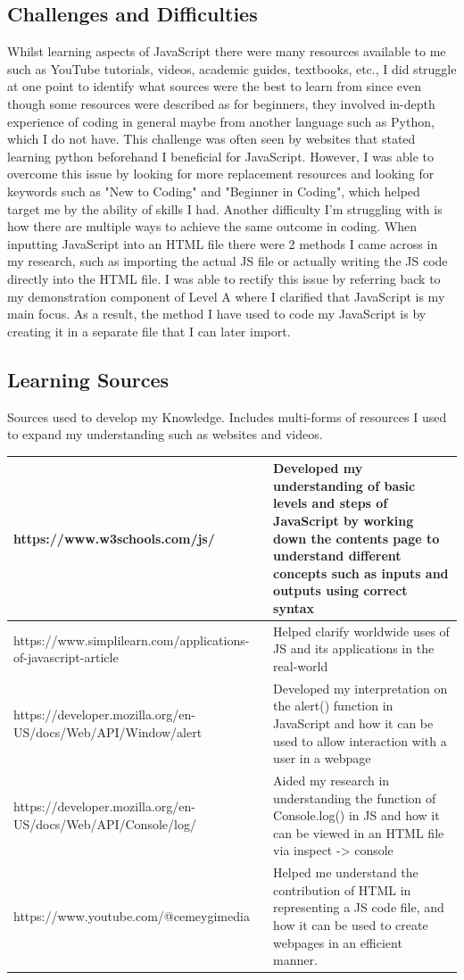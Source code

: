 \documentclass[a4paper, 11pt]{report}
\begin{document}
\subsection{Challenges and Difficulties}
Whilst learning aspects of JavaScript there were many resources available to me such as YouTube tutorials, videos, academic guides, textbooks, etc., I did struggle at one point to identify what sources were the best to learn from since even though some resources were described as for beginners, they involved in-depth experience of coding in general maybe from another language such as Python, which I do not have. This challenge was often seen by websites that stated learning python beforehand I beneficial for JavaScript. However, I was able to overcome this issue by looking for more replacement resources and looking for keywords such as "New to Coding" and "Beginner in Coding", which helped target me by the ability of skills I had. Another difficulty I'm struggling with is how there are multiple ways to achieve the same outcome in coding. When inputting JavaScript into an HTML file there were 2 methods I came across in my research, such as importing the actual JS file or actually writing the JS code directly into the HTML file. I was able to rectify this issue by referring back to my demonstration component of Level A where I clarified that JavaScript is my main focus. As a result, the method I have used to code my JavaScript is by creating it in a separate file that I can later import.

\subsection{Learning Sources}
Sources used to develop my Knowledge. Includes multi-forms of resources I used to expand my understanding such as websites and videos.

\begin{tabular}{|p{}|p{}|}
	\hline
	https://www.w3schools.com/js/ & Developed my understanding of basic levels and steps of JavaScript by working down the contents page to understand different concepts such as inputs and outputs using correct syntax  \\
	\hline
	https://www.simplilearn.com/applications-of-javascript-article & Helped clarify worldwide uses of JS and its applications in the real-world \\
	\hline
	https://developer.mozilla.org/en-US/docs/Web/API/Window/alert & Developed my interpretation on the alert() function in JavaScript and how it can be used to allow interaction with a user in a webpage\\
	\hline
	https://developer.mozilla.org/en-US/docs/Web/API/Console/log/ & Aided my research in understanding the function of Console.log() in JS and how it can be viewed in an HTML file via inspect -> console\\
	\hline
	https://www.youtube.com/@cemeygimedia & Helped me understand the contribution of HTML in representing a JS code file, and how it can be used to create webpages in an efficient manner.\\
	\hline
\end{tabular}
\end{document}
